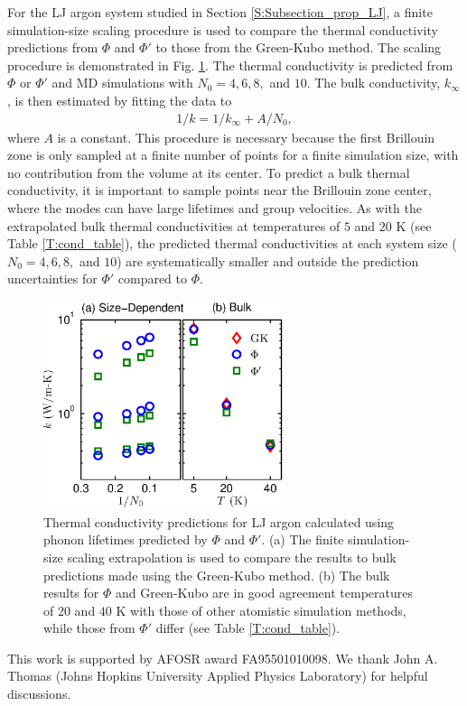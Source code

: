 For the LJ argon system studied in Section \ref{S:Subsection_prop_LJ}, a 
finite simulation-size scaling procedure
\cite{turney_predicting_2009,he_thermal_2011} is used 
to compare the thermal conductivity predictions from $\Phi$ and $\Phi'$ to 
those from the Green-Kubo method. The scaling procedure is demonstrated in 
Fig$.$ \ref{F:LJ_COND}.  The thermal conductivity is predicted from $\Phi$ 
or $\Phi'$ and MD simulations with $N_0 = 4,6,8,$ and $10$. The bulk 
conductivity, $k_{\infty}$, is then estimated by fitting the data to
\begin{equation}\label{k_size}
\begin{split}
1/k = 1/k_{\infty} + A/N_0,
 \end{split}
\end{equation}
where $A$ is a constant. This procedure is necessary because the first 
Brillouin zone is only sampled at a finite number of points for a finite 
simulation size, with no contribution from the volume at its center. To 
predict a bulk thermal conductivity, it is important to sample points 
near the Brillouin zone center, where the modes can have large lifetimes 
and group velocities.\cite{turney_predicting_2009,sellan_size_2010} 
As with the 
extrapolated bulk thermal conductivities at temperatures of $5$ and 
$20$ K (see Table \ref{T:cond_table}), the predicted thermal 
conductivities at each system size ($N_0=4,6,8,$ and $10$) are 
systematically smaller and outside the prediction uncertainties for 
$\Phi'$ compared to $\Phi$.

\begin{figure}
\includegraphics[angle=0,width=70.0mm]{LJ_NMD_SED_COND_2.eps}
\caption{\label{F:LJ_COND} Thermal conductivity predictions for LJ argon 
calculated using phonon lifetimes predicted by $\Phi$ and $\Phi'$. (a) 
The finite simulation-size scaling extrapolation 
\cite{turney_predicting_2009,he_thermal_2011} 
is used to compare the results to bulk predictions made using the 
Green-Kubo method. (b) The bulk results for $\Phi$ and Green-Kubo are 
in good agreement temperatures of $20$ and $40$ K with those of other 
atomistic simulation methods,\cite{turney_predicting_2009} while those 
from $\Phi'$ differ (see Table \ref{T:cond_table}).}
\end{figure}

\ack
This work is supported by AFOSR award FA95501010098. We thank John A. 
Thomas (Johns Hopkins 
University Applied Physics Laboratory) for helpful discussions.

